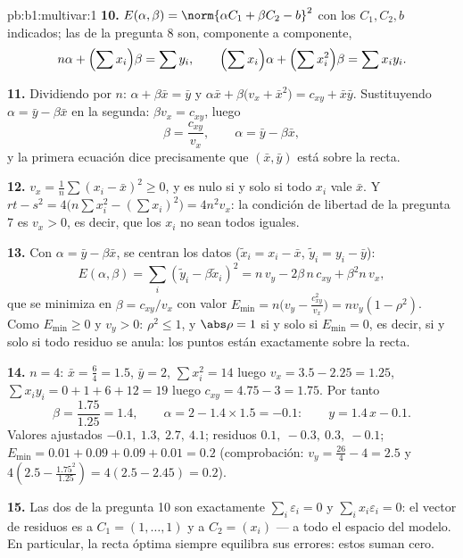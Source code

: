 \begin{solution}{pb:b1:multivar:1}
\textbf{10.} $E(\alpha, \beta) = \norm{\alpha C_1 + \beta C_2 -
b}^2$ con los $C_1, C_2, b$ indicados; las  de
la pregunta 8 son, componente a componente,
\[
n\alpha + \Bigl(\sum x_i\Bigr)\beta = \sum y_i,
\qquad
\Bigl(\sum x_i\Bigr)\alpha + \Bigl(\sum x_i^2\Bigr)\beta = \sum
x_i y_i .
\]

\textbf{11.} Dividiendo por $n$: $\alpha + \beta\bar x = \bar y$
y $\alpha\bar x + \beta\bigl(v_x + \bar x^2\bigr) = c_{xy} +
\bar x\bar y$. Sustituyendo $\alpha = \bar y - \beta\bar x$ en
la segunda: $\beta v_x = c_{xy}$, luego
\[
\beta = \frac{c_{xy}}{v_x}, \qquad \alpha = \bar y - \beta\bar
x ,
\]
y la primera ecuación dice precisamente que $(\bar x, \bar y)$
está sobre la recta.

\textbf{12.} $v_x = \frac1n\sum(x_i - \bar x)^2 \geq 0$, y es nulo
si y solo si todo $x_i$ vale $\bar x$. Y $rt - s^2 = 4\bigl(n\sum
x_i^2 - (\sum x_i)^2\bigr) = 4n^2 v_x$: la condición de libertad de la pregunta 7
es $v_x > 0$, es decir, que los $x_i$ no sean todos iguales.

\textbf{13.} Con $\alpha = \bar y - \beta\bar x$, se centran los
datos ($\tilde x_i = x_i - \bar x$, $\tilde y_i = y_i - \bar y$):
\[
E(\alpha, \beta) = \sum_i(\tilde y_i - \beta\tilde x_i)^2
= n\,v_y - 2\beta\,n\,c_{xy} + \beta^2 n\,v_x ,
\]
que se minimiza en $\beta = c_{xy}/v_x$ con valor $E_{\min} =
n\bigl(v_y - \frac{c_{xy}^2}{v_x}\bigr) = n v_y(1 - \rho^2)$.
Como $E_{\min} \geq 0$ y $v_y > 0$: $\rho^2 \leq 1$, y
$\abs\rho = 1$ si y solo si $E_{\min} = 0$, es decir, si y solo si todo residuo
se anula: los puntos están exactamente sobre la recta.

\textbf{14.} $n = 4$: $\bar x = \frac64 = 1.5$, $\bar y = 2$,
$\sum x_i^2 = 14$ luego $v_x = 3.5 - 2.25 = 1.25$, $\sum x_iy_i =
0 + 1 + 6 + 12 = 19$ luego $c_{xy} = 4.75 - 3 = 1.75$. Por tanto
\[
\beta = \frac{1.75}{1.25} = 1.4,
\qquad
\alpha = 2 - 1.4\times1.5 = -0.1 :
\qquad y = 1.4\,x - 0.1 .
\]
Valores ajustados $-0.1,\ 1.3,\ 2.7,\ 4.1$; residuos $0.1,\ -0.3,\
0.3,\ -0.1$; $E_{\min} = 0.01 + 0.09 + 0.09 + 0.01 = 0.2$
(comprobación: $v_y = \frac{26}4 - 4 = 2.5$ y $4(2.5 -
\frac{1.75^2}{1.25}) = 4(2.5 - 2.45) = 0.2$).

\textbf{15.} Las dos  de la pregunta 10 son
exactamente $\sum_i\varepsilon_i = 0$ y $\sum_i x_i\varepsilon_i =
0$: el vector de residuos es  a $C_1 = (1, \dots, 1)$
y a $C_2 = (x_i)$ --- a todo el espacio del modelo. En
particular, la recta óptima siempre equilibra sus errores: estos
suman cero.


\end{solution}
